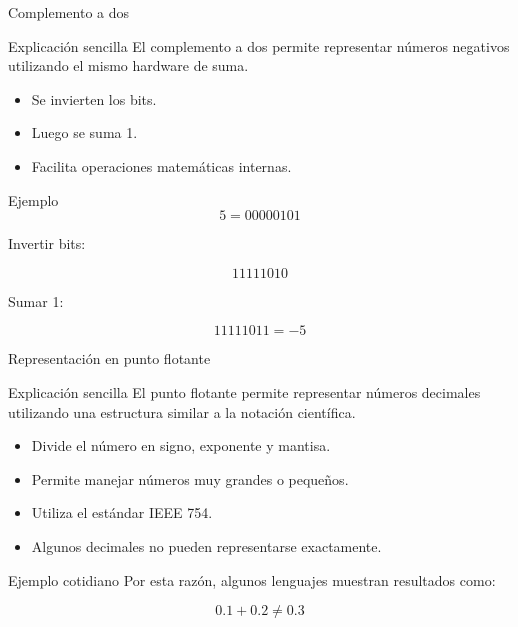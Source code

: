 \documentclass[10pt,aspectratio=169]{beamer}
\begin{document}
	\begin{frame}{Complemento a dos}
		
		\begin{block}{Explicación sencilla}
			El complemento a dos permite representar números negativos utilizando el mismo hardware de suma.
		\end{block}
		
		\begin{itemize}
			\item Se invierten los bits.
			\item Luego se suma 1.
			\item Facilita operaciones matemáticas internas.
		\end{itemize}
		
		\vspace{0.3cm}
		
		\begin{block}{Ejemplo}
			\[
			5 = 00000101
			\]
			
			Invertir bits:
			
			\[
			11111010
			\]
			
			Sumar 1:
			
			\[
			11111011 = -5
			\]
		\end{block}
		
	\end{frame}
	
	
	\begin{frame}{Representación en punto flotante}
		
		\small
		
		\begin{block}{Explicación sencilla}
			El punto flotante permite representar números decimales utilizando una estructura similar a la notación científica.
		\end{block}
		
		\begin{itemize}
			\item Divide el número en signo, exponente y mantisa.
			\item Permite manejar números muy grandes o pequeños.
			\item Utiliza el estándar IEEE 754.
			\item Algunos decimales no pueden representarse exactamente.
		\end{itemize}
		
		\begin{block}{Ejemplo cotidiano}
			Por esta razón, algunos lenguajes muestran resultados como:
			
			\[
			0.1 + 0.2 \neq 0.3
			\]
		\end{block}
		
	\end{frame}
	
\end{document}
